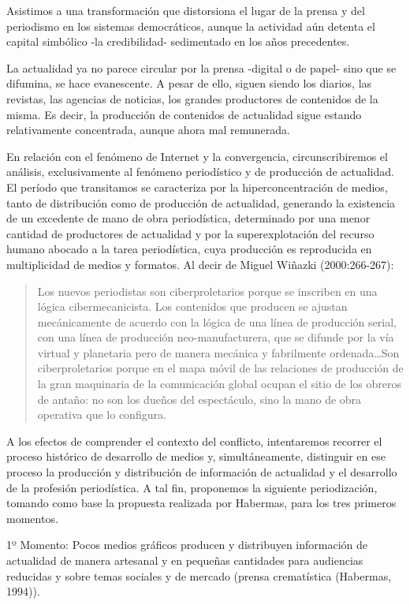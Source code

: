Asistimos a una transformación que distorsiona el lugar de la prensa y del periodismo en los sistemas democráticos, aunque la actividad aún detenta el capital simbólico -la credibilidad- sedimentado en los años precedentes.

La actualidad ya no parece circular por la prensa -digital o de papel- sino que se difumina, se hace evanescente. A pesar de ello, siguen siendo los diarios, las revistas, las agencias de noticias, los grandes productores de contenidos de la misma. Es decir, la producción de contenidos de actualidad sigue estando relativamente concentrada, aunque ahora mal remunerada.

En relación con el fenómeno de Internet y la convergencia, circunscribiremos el análisis, exclusivamente al fenómeno periodístico y de producción de actualidad. El período que transitamos se caracteriza por la hiperconcentración de medios, tanto de distribución como de producción de actualidad, generando la existencia de un excedente de mano de obra periodística, determinado por una menor cantidad de productores de actualidad y por la superexplotación del recurso humano abocado a la tarea periodística, cuya producción es reproducida en multiplicidad de medios y formatos. Al decir de Miguel Wiñazki (2000:266-267):

\begin{quote}
Los nuevos periodistas son ciberproletarios porque se inscriben en una lógica cibermecanicista. Los contenidos que producen se ajustan mecánicamente de acuerdo con la lógica de una línea de producción serial, con una línea de producción neo-manufacturera, que se difunde por la vía virtual y planetaria pero de manera mecánica y fabrilmente ordenada\ldots Son ciberproletarios porque en el mapa móvil de las relaciones de producción de la gran maquinaria de la comunicación global ocupan el sitio de los obreros de antaño: no son los dueños del espectáculo, sino la mano de obra operativa que lo configura.
\end{quote}

A los efectos de comprender el contexto del conflicto, intentaremos recorrer el proceso histórico de desarrollo de medios y, simultáneamente, distinguir en ese proceso la producción y distribución de información de actualidad y el desarrollo de la profesión periodística. A tal fin, proponemos la siguiente periodización, tomando como base la propuesta realizada por Habermas, para los tres primeros momentos.

1º Momento: Pocos medios gráficos producen y distribuyen información de actualidad de manera artesanal y en pequeñas cantidades para audiencias reducidas y sobre temas sociales y de mercado (prensa crematística (Habermas, 1994)).

